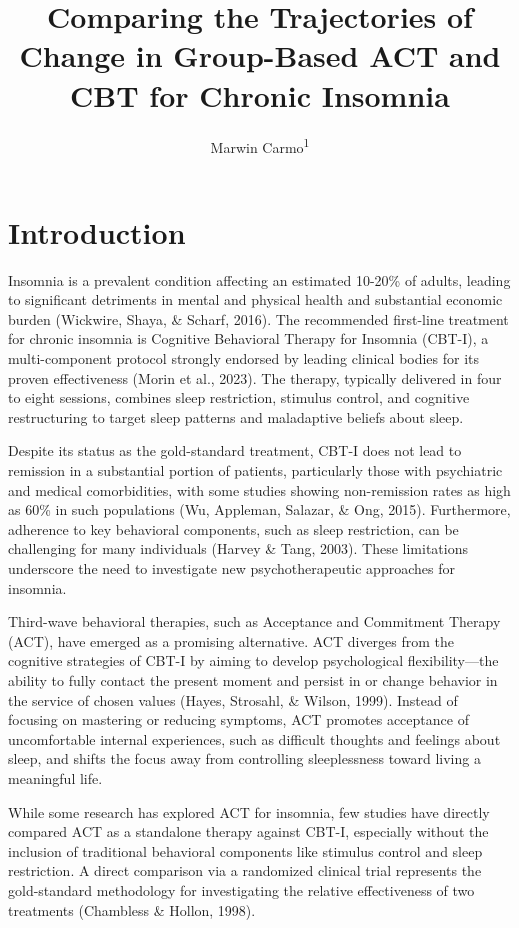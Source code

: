 \documentclass[
  english,
  man]{apa6}
\title{Comparing the Trajectories of Change in Group-Based ACT and CBT for Chronic Insomnia}
\author{Marwin Carmo\textsuperscript{1}}
\date{}
\affiliation{\vspace{0.5cm}\textsuperscript{1} University of California, Davis}
\begin{document}
\maketitle

\section{Introduction}\label{introduction}

Insomnia is a prevalent condition affecting an estimated 10-20\% of adults, leading to significant detriments in mental and physical health and substantial economic burden (Wickwire, Shaya, \& Scharf, 2016). The recommended first-line treatment for chronic insomnia is Cognitive Behavioral Therapy for Insomnia (CBT-I), a multi-component protocol strongly endorsed by leading clinical bodies for its proven effectiveness (Morin et al., 2023). The therapy, typically delivered in four to eight sessions, combines sleep restriction, stimulus control, and cognitive restructuring to target sleep patterns and maladaptive beliefs about sleep.

Despite its status as the gold-standard treatment, CBT-I does not lead to remission in a substantial portion of patients, particularly those with psychiatric and medical comorbidities, with some studies showing non-remission rates as high as 60\% in such populations (Wu, Appleman, Salazar, \& Ong, 2015). Furthermore, adherence to key behavioral components, such as sleep restriction, can be challenging for many individuals (Harvey \& Tang, 2003). These limitations underscore the need to investigate new psychotherapeutic approaches for insomnia.

Third-wave behavioral therapies, such as Acceptance and Commitment Therapy (ACT), have emerged as a promising alternative. ACT diverges from the cognitive strategies of CBT-I by aiming to develop psychological flexibility---the ability to fully contact the present moment and persist in or change behavior in the service of chosen values (Hayes, Strosahl, \& Wilson, 1999). Instead of focusing on mastering or reducing symptoms, ACT promotes acceptance of uncomfortable internal experiences, such as difficult thoughts and feelings about sleep, and shifts the focus away from controlling sleeplessness toward living a meaningful life.

While some research has explored ACT for insomnia, few studies have directly compared ACT as a standalone therapy against CBT-I, especially without the inclusion of traditional behavioral components like stimulus control and sleep restriction. A direct comparison via a randomized clinical trial represents the gold-standard methodology for investigating the relative effectiveness of two treatments (Chambless \& Hollon, 1998).
\end{document}
